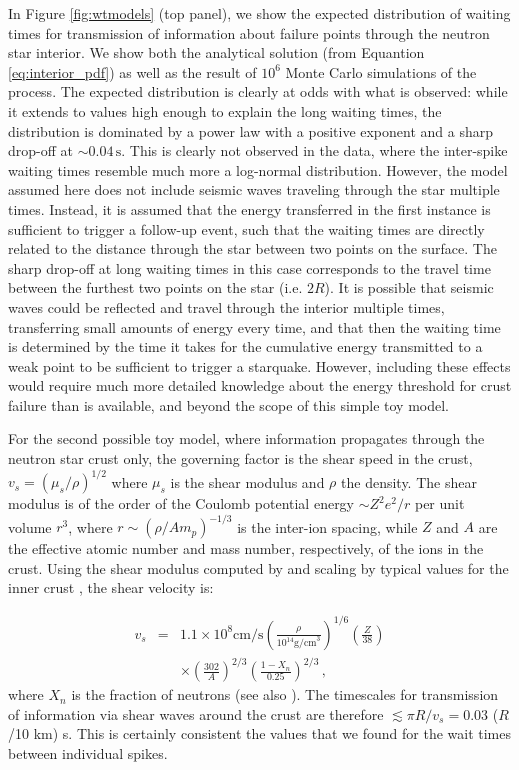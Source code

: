 \documentclass[12pt]{emulateapj}
\begin{document}
In Figure \ref{fig:wtmodels} (top panel), we show the expected distribution of waiting times for transmission of information about failure points through the 
neutron star interior. We show both the analytical solution (from Equantion \ref{eq:interior_pdf}) as well as the result of $10^{6}$ Monte Carlo simulations
 of the process.
The expected distribution is clearly at odds with what is observed: while it extends to values high enough to explain the long waiting times, the distribution 
is dominated by a power law with a positive exponent and a sharp drop-off at $\sim\!\! 0.04\,\mathrm{s}$. This is clearly not observed in the data, where 
the inter-spike waiting times resemble much more a log-normal distribution. However, the model assumed here does not include seismic waves traveling 
through the star multiple times. Instead, it is assumed that the energy transferred in the first instance is sufficient to trigger a follow-up event, such that the 
waiting times are directly related to the distance through the star between two points on the surface. The sharp drop-off at long waiting times in this case 
corresponds to the travel time between the furthest two points on the star (i.e. $2R$). It is possible that seismic waves could be reflected and travel through 
the interior multiple times, transferring small amounts of energy every time, and that then the waiting time is determined by the time it takes for the cumulative 
energy transmitted to a weak point to be sufficient to trigger a starquake. However, including these effects would require much more detailed knowledge about 
the energy threshold for crust failure than is available, and beyond the scope of this simple toy model.  

For the second possible toy model, where information propagates through the neutron star crust only, the governing factor is the shear speed in the 
crust, $v_s = (\mu_s/\rho)^{1/2}$ where $\mu_s$ is the shear modulus and $\rho$ the density. The shear modulus is of the order of the Coulomb potential 
energy $\sim Z^2e^2/r$ per unit volume $r^3$, where $r\sim(\rho/Am_p)^{-1/3}$ is the inter-ion spacing, while $Z$ and $A$ are the effective atomic number 
and mass number, respectively, of the ions in the crust. Using the shear modulus computed by \citet{strohmayer1991} and scaling by typical values for the 
inner crust \citep{douchin2001}, the shear velocity is:

\begin{eqnarray}
v_s & = & 1.1 \times 10^8 \mathrm{cm/s} \left(\frac{\rho}{10^{14} \mathrm{g/cm}^3}\right)^{1/6} \left(\frac{Z}{38}\right) \\
&& \times \left(\frac{302}{A}\right)^{2/3} \left(\frac{1-X_n}{0.25}\right)^{2/3} \nonumber \, ,
\end{eqnarray}
where $X_n$ is the fraction of neutrons (see also \citet{piro2005}). The timescales for transmission of information via shear waves around the crust are 
therefore $\lesssim \pi R/v_s = 0.03$ ($R$/10 km) s. This is certainly consistent the values that we found for the wait times between individual spikes. 
\end{document}
